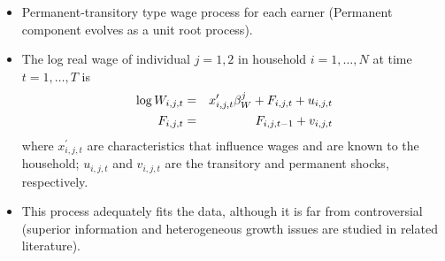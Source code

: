 \documentclass[notes=show]{beamer}
\begin{document}
\begin{frame}%



\begin{itemize}
\item Permanent-transitory type wage process for each earner (Permanent
component evolves as a unit root process).

\item The log real wage of individual $j=1,2$ in household $i=1,\ldots ,N$
at time $t=1,\ldots ,T$ is%
\begin{eqnarray}
\log W_{i,j,t} &=&x_{i,j,t}^{\prime }\beta _{W}^{j}+F_{i,j,t}+u_{i,j,t} \\
F_{i,j,t} &=&F_{i,j,t-1}+v_{i,j,t}  \notag
\end{eqnarray}%
where $x_{i,j,t}^{\prime }$ are characteristics that influence wages and are
known to the household; $u_{i,j,t}$ and $v_{i,j,t}$ are the transitory and
permanent shocks, respectively.

\item This process adequately fits the data, although it is far from
controversial (superior information and heterogeneous growth issues are
studied in related literature).
\end{itemize}

\transboxout%
\end{frame}%

\bigskip
\end{document}
